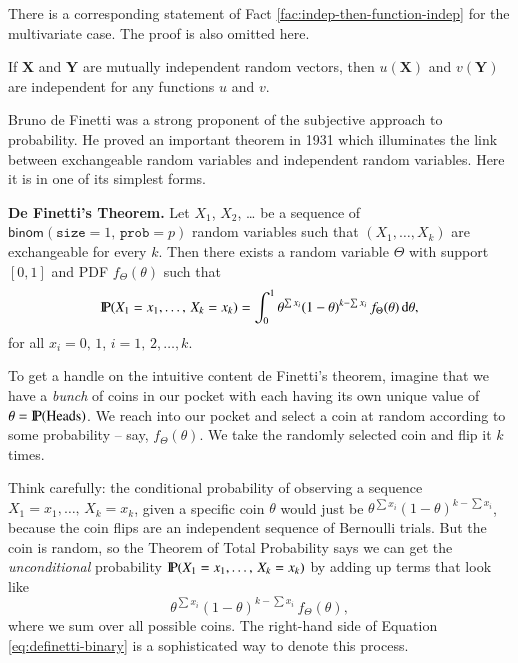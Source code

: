 \documentclass[captions=tableheading]{scrbook}
\begin{document}
There is a corresponding statement of Fact \ref{fac:indep-then-function-indep} for the multivariate case. The proof is also omitted here. 

\begin{fact}
If \(\mathbf{X}\) and \(\mathbf{Y}\) are mutually independent random vectors, then \(u(\mathbf{X})\) and \(v(\mathbf{Y})\) are independent for any functions \(u\) and \(v\).
\end{fact}

Bruno de Finetti was a strong proponent of the subjective approach to probability. He proved an important theorem in 1931 which illuminates the link between exchangeable random variables and independent random variables. Here it is in one of its simplest forms. 

\begin{thm}
\textbf{De Finetti's Theorem.} Let \(X_{1}\), \(X_{2}\), \ldots{} be a sequence of \(\mathsf{binom}(\mathtt{size}=1,\,\mathtt{prob}=p)\) random variables such that \((X_{1},\ldots,X_{k})\) are exchangeable for every \(k\). Then there exists a random variable \(\Theta\) with support \([0,1]\) and PDF \(f_{\Theta}(\theta)\) such that
\begin{equation}
\P(X_{1}=x_{1},\ldots,\, X_{k}=x_{k})=\int_{0}^{1}\theta^{\sum x_{i}}(1-\theta)^{k-\sum x_{i}}\, f_{\Theta}(\theta)\,\mathrm{d}\theta,\label{eq:definetti-binary}
\end{equation}
for all \(x_{i}=0,\,1\), \(i=1,\,2,\ldots,k\).
\end{thm}

To get a handle on the intuitive content de Finetti's theorem, imagine that we have a \emph{bunch} of coins in our pocket with each having its own unique value of \(\theta=\P(\mbox{Heads})\). We reach into our pocket and select a coin at random according to some probability -- say, \(f_{\Theta}(\theta)\). We take the randomly selected coin and flip it \(k\) times. 

Think carefully: the conditional probability of observing a sequence  \(X_{1}=x_{1},\ldots,\, X_{k}=x_{k}\), given a specific coin \(\theta\) would just be \(\theta^{\sum x_{i}}(1-\theta)^{k-\sum x_{i}}\), because the coin flips are an independent sequence of Bernoulli trials. But the coin is random, so the Theorem of Total Probability says we can get the \emph{unconditional} probability \(\P(X_{1}=x_{1},\ldots,\, X_{k}=x_{k})\) by adding up terms that look like
\begin{equation}
\theta^{\sum x_{i}}(1-\theta)^{k-\sum x_{i}}\, f_{\Theta}(\theta),
\end{equation}
where we sum over all possible coins. The right-hand side of Equation \ref{eq:definetti-binary} is a sophisticated way to denote this process.
\end{document}

